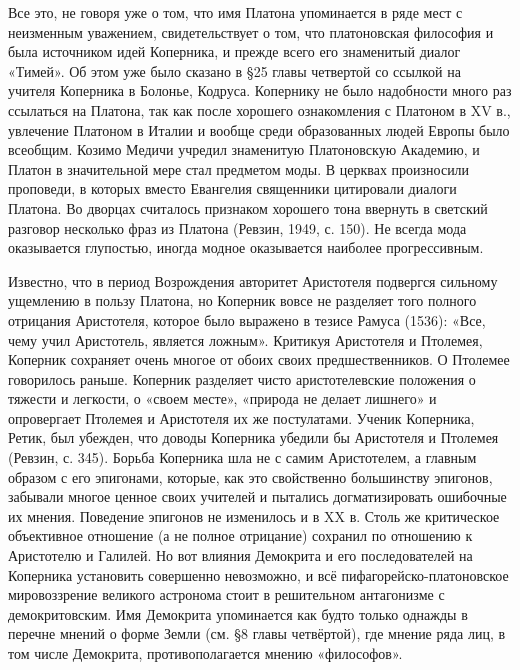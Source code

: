Все это, не говоря уже о том, что имя Платона упоминается в ряде мест
с неизменным уважением, свидетельствует о том, что платоновская
философия и была источником идей Коперника, и прежде всего его
знаменитый диалог «Тимей». Об этом уже было сказано в §25 главы
четвертой со ссылкой на учителя Коперника в Болонье, Кодруса.
Копернику не было надобности много раз ссылаться на Платона, так как
после хорошего ознакомления с Платоном в XV в., увлечение Платоном в
Италии и вообще среди образованных людей Европы было всеобщим. Козимо
Медичи учредил знаменитую Платоновскую Академию, и Платон в
значительной мере стал предметом моды. В церквах произносили
проповеди, в которых вместо Евангелия священники цитировали диалоги
Платона. Во дворцах считалось признаком хорошего тона ввернуть в
светский разговор несколько фраз из Платона (Ревзин, 1949, с. 150). Не
всегда мода оказывается глупостью, иногда модное оказывается наиболее
прогрессивным.

Известно, что в период Возрождения авторитет Аристотеля подвергся
сильному ущемлению в пользу Платона, но Коперник вовсе не разделяет
того полного отрицания Аристотеля, которое было выражено в тезисе
Рамуса (1536): «Все, чему учил Аристотель, является ложным». Критикуя
Аристотеля и Птолемея, Коперник сохраняет очень многое от обоих своих
предшественников. О Птолемее говорилось раньше. Коперник разделяет
чисто аристотелевские положения о тяжести и легкости, о «своем месте»,
«природа не делает лишнего» и опровергает Птолемея и Аристотеля их же
постулатами. Ученик Коперника, Ретик, был убежден, что доводы
Коперника убедили бы Аристотеля и Птолемея (Ревзин, с. 345). Борьба
Коперника шла не с самим Аристотелем, а главным образом с его
эпигонами, которые, как это свойственно большинству эпигонов, забывали
многое ценное своих учителей и пытались догматизировать ошибочные их
мнения. Поведение эпигонов не изменилось и в XX в. Столь же
критическое объективное отношение (а не полное отрицание) сохранил по
отношению к Аристотелю и Галилей. Но вот влияния Демокрита и его
последователей на Коперника установить совершенно невозможно, и всё
пифагорейско-платоновское мировоззрение великого астронома стоит в
решительном антагонизме с демокритовским. Имя Демокрита упоминается
как будто только однажды в перечне мнений о форме Земли (см. §8 главы
четвёртой), где мнение ряда лиц, в том числе Демокрита,
противополагается мнению «философов».

